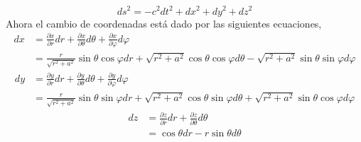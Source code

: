 $$
    d s^2=-c^2 d t^2+d x^2+d y^2+d z^2
$$
Ahora el cambio de coordenadas está dado por las siguientes ecuaciones,
\begin{align}
    d x & = \frac{\partial x}{\partial r} d r + \frac{\partial x}{\partial \theta} d \theta + \frac{\partial x}{\partial \varphi} d \varphi \nonumber                    \\
        & = \frac{r}{\sqrt{r^2+a^2}} \sin \theta \cos \varphi d r + \sqrt{r^2+a^2} \cos \theta \cos \varphi d \theta - \sqrt{r^2+a^2} \sin \theta \sin \varphi d \varphi
\end{align}
\begin{align}
    d y & = \frac{\partial y}{\partial r} d r + \frac{\partial y}{\partial \theta} d \theta + \frac{\partial y}{\partial \varphi} d \varphi \nonumber                    \\
        & = \frac{r}{\sqrt{r^2+a^2}} \sin \theta \sin \varphi d r + \sqrt{r^2+a^2} \cos \theta \sin \varphi d \theta + \sqrt{r^2+a^2} \sin \theta \cos \varphi d \varphi
\end{align}
\begin{align}
    d z & = \frac{\partial z}{\partial r} d r + \frac{\partial z}{\partial \theta} d \theta \nonumber \\
        & = \cos \theta d r - r \sin \theta d \theta
\end{align}

